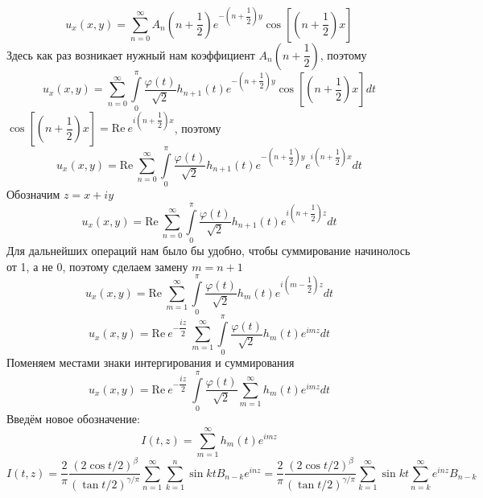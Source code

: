 \documentclass[12pt, a4paper]{article}
\begin{document}
	\begin{equation*}
		u_x(x,y) = \sum\limits_{n=0}^{\infty} A_n \left(n +\dfrac12\right) e^{-\left(n + \dfrac12\right)y} \cos{\left[\left(n + \dfrac12\right)x\right]}
	\end{equation*}
	Здесь как раз возникает нужный нам коэффициент $A_n \left(n+\dfrac12\right)$, поэтому
	\begin{equation*}
		u_x(x,y)  =  \sum\limits_{n=0}^{\infty}  \int\limits_0^\pi \dfrac{\varphi(t)}{\sqrt2}  h_{n+1}(t)  e^{-\left(n + \dfrac12\right)y} \cos{\left[\left(n + \dfrac12\right)x\right]} dt
	\end{equation*}
	$\cos{\left[\left(n + \dfrac12\right)x\right]} = \mathrm{Re} \ e^{i\left(n + \dfrac12\right)x}$, поэтому
	\begin{equation*}
		u_x(x,y)  = \mathrm{Re} \ \sum\limits_{n=0}^{\infty}  \int\limits_0^\pi \dfrac{\varphi(t)}{\sqrt2}  h_{n+1}(t)  e^{-\left(n + \dfrac12\right)y} e^{i\left(n + \dfrac12\right)x} dt
	\end{equation*}
	Обозначим $z = x + iy$
	\begin{equation*}
		u_x(x,y)  = \mathrm{Re} \ \sum\limits_{n=0}^{\infty}  \int\limits_0^\pi \dfrac{\varphi(t)}{\sqrt2}  h_{n+1}(t)  e^{i\left(n+\dfrac12\right) z}  dt
	\end{equation*}
	Для дальнейших операций нам было бы удобно, чтобы суммирование начинолось от 1, а не 0, поэтому сделаем замену $m = n +1$
	\begin{equation*}
		u_x(x,y)  = \mathrm{Re} \ \sum\limits_{m=1}^{\infty}  \int\limits_0^\pi \dfrac{\varphi(t)}{\sqrt2}  h_{m}(t)  e^{i\left(m-\dfrac12\right) z}  dt
	\end{equation*}
	\begin{equation*}
		u_x(x,y)  = \mathrm{Re} \ e^{-\dfrac{iz}{2}}\ \sum\limits_{m=1}^{\infty}  \int\limits_0^\pi \dfrac{\varphi(t)}{\sqrt2}  h_{m}(t)  e^{im z}  dt
	\end{equation*}
	Поменяем местами знаки интергирования и суммирования
	\begin{equation*}
		u_x(x,y)  = \mathrm{Re} \ e^{-\dfrac{iz}{2}}\  \int\limits_0^\pi \dfrac{\varphi(t)}{\sqrt2}  \sum\limits_{m=1}^{\infty}   h_{m}(t)  e^{im z}  dt
	\end{equation*}
	Введём новое обозначение:
	\begin{equation*}
		I(t,z) = \sum\limits_{m=1}^{\infty}  h_{m}(t)  e^{im z}
	\end{equation*}
	\begin{equation*}
		I(t,z) =\dfrac{2}{\pi}\dfrac{(2\cos{t/2})^\beta}{(\tan{t/2})^{\gamma/\pi}} \sum\limits_{n=1}^{\infty}   \sum\limits_{k=1}^n \sin{kt} B_{n-k} e^{inz} = 
		\dfrac{2}{\pi}\dfrac{(2\cos{t/2})^\beta}{(\tan{t/2})^{\gamma/\pi}} \sum\limits_{k=1}^{\infty} \sin{kt} \sum\limits_{n=k}^{\infty} e^{inz} B_{n-k}
	\end{equation*}
\end{document}
